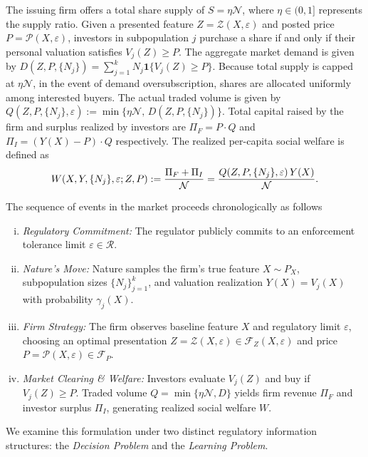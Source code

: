 The issuing firm offers a total share supply of $S = \eta \mathcal{N}$, where $\eta \in (0,1]$ represents the supply ratio. Given a presented feature $Z = \mathcal{Z}(X, \varepsilon)$ and posted price $P = \mathcal{P}(X, \varepsilon)$, investors in subpopulation $j$ purchase a share if and only if their personal valuation satisfies $V_j(Z) \ge P$. The aggregate market demand is given by $D(Z, P, \{N_j\}) = \sum_{j=1}^k N_j \mathbf{1}\{V_j(Z) \ge P\}$. Because total supply is capped at $\eta \mathcal{N}$, in the event of demand oversubscription, shares are allocated uniformly among interested buyers. The actual traded volume is given by $Q(Z, P, \{N_j\}, \varepsilon) := \min\{\eta \mathcal{N},\, D(Z, P, \{N_j\})\}$. Total capital raised by the firm and surplus realized by investors are $\Pi_F = P \cdot Q$ and $\Pi_I = (Y(X) - P) \cdot Q$ respectively. The realized per-capita social welfare is defined as
\begin{equation}\label{eqn:social_welfare_def}\index{Social welfare|textbf}
W(X, Y, \{N_j\}, \varepsilon; Z, P) := \frac{\Pi_F + \Pi_I}{\mathcal{N}} = \frac{Q(Z, P, \{N_j\}, \varepsilon)\, Y(X)}{\mathcal{N}}.
\end{equation}

The sequence of events in the market proceeds chronologically as follows
\begin{enumerate}[(i)]
    \item \textit{Regulatory Commitment:} The regulator publicly commits to an enforcement tolerance limit $\varepsilon \in \mathcal{R}$.
    \item \textit{Nature's Move:} Nature samples the firm's true feature $X \sim P_X$, subpopulation sizes $\{N_j\}_{j=1}^k$, and valuation realization $Y(X) = V_j(X)$ with probability $\gamma_j(X)$.
    \item \textit{Firm Strategy:} The firm observes baseline feature $X$ and regulatory limit $\varepsilon$, choosing an optimal presentation $Z = \mathcal{Z}(X, \varepsilon) \in \mathcal{F}_Z(X, \varepsilon)$ and price $P = \mathcal{P}(X, \varepsilon) \in \mathcal{F}_P$.
    \item \textit{Market Clearing \& Welfare:} Investors evaluate $V_j(Z)$ and buy if $V_j(Z) \ge P$. Traded volume $Q = \min\{\eta \mathcal{N}, D\}$ yields firm revenue $\Pi_F$ and investor surplus $\Pi_I$, generating realized social welfare $W$.
\end{enumerate}

We examine this formulation under two distinct regulatory information structures: the \emph{Decision Problem} and the \emph{Learning Problem}.

